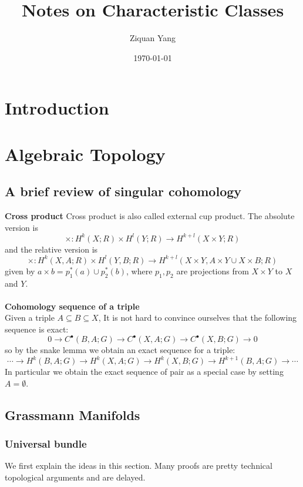 \documentclass[12pt]{article}
\theoremstyle{plain}
\theoremstyle{definition}
\newcommand{\<}{\langle}
\renewcommand{\>}{\rangle}
\begin{document}
%

\title{Notes on Characteristic Classes}
\author{Ziquan Yang}


\date{\today}

\maketitle
 
\tableofcontents

\section{Introduction}
\section{Algebraic Topology}
\subsection{A brief review of singular cohomology}
\textbf{Cross product}
Cross product is also called external cup product. The absolute version is 
$$ \times : H^k(X; R) \times H^l(Y; R) \to H^{k + l}(X \times Y; R) $$
and the relative version is 
$$ \times : H^k(X, A; R) \times H^l(Y, B; R) \to H^{k + l}(X \times Y, A \times Y \cup X \times B; R)$$
given by $a \times b = p_1^*(a) \cup p_2^*(b)$, where $p_1, p_2$ are projections from $X \times Y$ to $X$ and $Y$. \\\\
\textbf{Cohomology sequence of a triple}\\
Given a triple $A \subseteq B \subseteq X$, It is not hard to convince ourselves that the following sequence is exact:
$$ 0 \to C^\bullet (B, A; G) \to C^\bullet (X, A; G) \to C^\bullet(X, B; G) \to 0 $$
so by the snake lemma we obtain an exact sequence for a triple:
$$ \cdots \to H^k(B, A; G) \to H^k(X, A; G) \to H^k(X, B; G) \to H^{k + 1}(B, A; G) \to \cdots $$
In particular we obtain the exact sequence of pair as a special case by setting $A = \emptyset$. 

\subsection{Grassmann Manifolds}
\subsubsection{Universal bundle}
We first explain the ideas in this section. Many proofs are pretty technical topological arguments and are delayed. 
\end{document}
